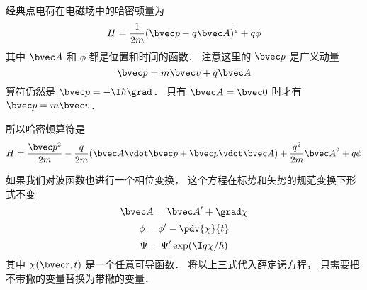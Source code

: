 

经典点电荷在电磁场中的哈密顿量为
\begin{equation}
H = \frac{1}{2m}(\bvec p - q\bvec A)^2 + q\phi
\end{equation}
其中 $\bvec A$ 和 $\phi$ 都是位置和时间的函数． 注意这里的 $\bvec p$ 是广义动量
\begin{equation}
\bvec p = m\bvec v + q\bvec A
\end{equation}
算符仍然是 ${\bvec p} = -\I\hbar\grad$． 只有 $\bvec A = \bvec 0$ 时才有 $\bvec p = m\bvec v$．

所以哈密顿算符是
\begin{equation}
H = \frac{\bvec p^2}{2m} - \frac{q}{2m}(\bvec A\vdot \bvec p + \bvec p \vdot \bvec A) + \frac{q^2}{2m} \bvec A^2 + q\phi
\end{equation}

如果我们对波函数也进行一个相位变换， 这个方程在标势和矢势的规范变换下形式不变
\begin{equation}
\bvec A = \bvec A' + \grad \chi
\end{equation}
\begin{equation}
\phi = \phi' - \pdv{\chi}{t}
\end{equation}
\begin{equation}
\Psi = \Psi' \exp(\I q\chi/\hbar)
\end{equation}
其中 $\chi(\bvec r, t)$ 是一个任意可导函数． 将以上三式代入薛定谔方程， 只需要把不带撇的变量替换为带撇的变量．
